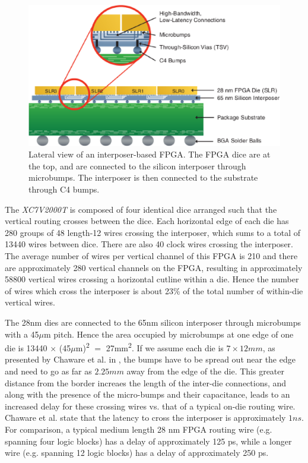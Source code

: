 \documentclass{sig-alternate-2013}
\begin{document}
\begin{figure}[!htbp]
\centering
\includegraphics[width=\linewidth]{interposer.eps}
\caption{Lateral view of an interposer-based FPGA\cite{xilinxWP}. The FPGA dice are at the top, and are connected to the silicon interposer through microbumps. The interposer is then connected to the substrate through C4 bumps.}
\label{fig:interposer}
\end{figure}


The \textit{XC7V2000T} is composed of four identical dice arranged such that the vertical routing crosses between the dice. Each horizontal edge of each die has 280 groups of 48 length-12 wires crossing the interposer, which sums to a total of 13440 wires between dice. There are also 40 clock wires crossing the interposer. The average number of wires per vertical channel of this FPGA is 210 and there are approximately 280 vertical channels on the FPGA, resulting in approximately 58800 vertical wires crossing a horizontal cutline within a die. Hence the number of wires which cross the interposer is about 23\% of the total number of within-die vertical wires.

The 28nm dies are connected to the 65nm silicon interposer through microbumps with a 45$\mu$m pitch. Hence the area occupied by microbumps at one edge of one die is 13440 $\times$ (45$\mu$m)\textsuperscript{2} $=$ 27mm\textsuperscript{2}. If we assume each die is $7 \times 12 mm$, as presented by Chaware et al. in \cite{xilinxTSV}, the bumps have to be spread out near the edge and need to go as far as $2.25mm$ away from the edge of the die. This greater distance from the border increaes the length of the inter-die connections, and along with the presence of the micro-bumps and their capacitance, leads to an increased delay for these crossing wires vs. that of a typical on-die routing wire. Chaware et al. state that the latency to cross the interposer is approximately $1ns$. For comparison, a typical medium length 28 nm FPGA routing wire (e.g. spanning four logic blocks) has a delay of approximately 125 ps, while a longer wire (e.g. spanning 12 logic blocks) has a delay of approximately 250 ps.
\end{document}
